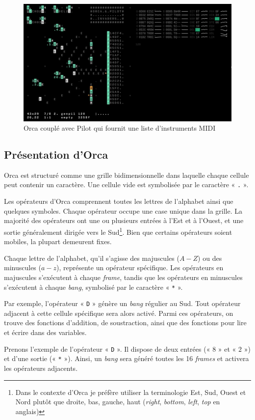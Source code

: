 \begin{figure}[h]
  \begin{minipage}[b]{1.0\linewidth}
    \centering
    \includegraphics[width=.5\linewidth]{images/experiments/orca01.jpg}
    \caption{Orca couplé avec Pilot qui fournit une liste d'instruments MIDI}
    \label{orca01}
  \end{minipage}
\end{figure}


\subsection*{Présentation d'Orca}
Orca est structuré comme une grille bidimensionnelle dans laquelle chaque cellule peut contenir un caractère. Une cellule vide est symbolisée par le caractère «  \lstinline{.}  ».

Les opérateurs d'Orca comprennent toutes les lettres de l'alphabet ainsi que quelques symboles. Chaque opérateur occupe une case unique dans la grille. La majorité des opérateurs ont une ou plusieurs entrées à l'Est et à l'Ouest, et une sortie généralement dirigée vers le Sud\footnote{Dans le contexte d'Orca je préfère utiliser la terminologie Est, Sud, Ouest et Nord plutôt que droite, bas, gauche, haut (\textit{right}, \textit{bottom}, \textit{left}, \textit{top} en anglais)}. Bien que certains opérateurs soient mobiles, la plupart demeurent fixes.

Chaque lettre de l'alphabet, qu'il s'agisse des majuscules ($A-Z$) ou des minuscules ($a-z$), représente un opérateur spécifique. Les opérateurs en majuscules s'exécutent à chaque \textit{frame}, tandis que les opérateurs en minuscules s'exécutent à chaque \textit{bang}, symbolisé par le caractère « \lstinline{*} ».

Par exemple, l'opérateur « \lstinline{D} » génère un \textit{bang} régulier au Sud. Tout opérateur adjacent à cette cellule spécifique sera alors activé. Parmi ces opérateurs, on trouve des fonctions d'addition, de soustraction, ainsi que des fonctions pour lire et écrire dans des variables.

Prenons l'exemple de l'opérateur « \lstinline{D} ». Il dispose de deux entrées (« $8$ » et « $2$ ») et d'une sortie (« \lstinline{*} »). Ainsi, un \textit{bang} sera généré toutes les 16 \textit{frames} et activera les opérateurs adjacents.

